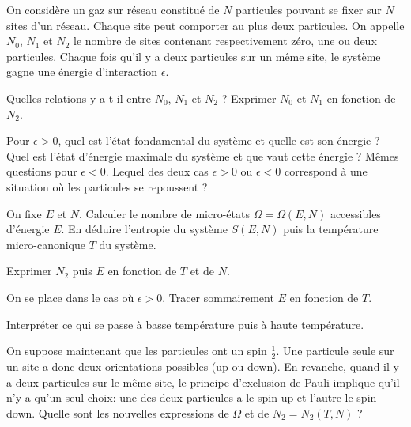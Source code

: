 On considère un gaz sur réseau constitué de $N$ particules pouvant se fixer sur $N$ sites d'un réseau. Chaque site peut comporter au plus deux particules. On appelle $N_0$, $N_1$ et $N_2$ le nombre de sites contenant respectivement zéro, une ou deux particules. Chaque fois qu'il y a deux particules sur un même site, le système gagne une énergie d’interaction $\epsilon$. 

\question Quelles relations y-a-t-il entre $N_0$, $N_1$ et $N_2$ ? Exprimer $N_0$ et $N_1$ en fonction de $N_2$.

\question Pour $\epsilon > 0 $, quel est l’état fondamental du système et quelle est son énergie ? Quel est l’état d’énergie maximale du système et que vaut cette énergie ? Mêmes questions pour $\epsilon < 0 $. Lequel des deux cas $\epsilon > 0 $ ou $\epsilon < 0 $ correspond à une situation où les particules se repoussent ?

\question On fixe $E$ et $N$. Calculer le nombre de micro-états $\Omega=\Omega(E,N)$ accessibles d'énergie $E$. En déduire l'entropie du système $S(E,N)$ puis la température micro-canonique $T$ du système.

\question Exprimer $N_2$ puis $E$ en fonction de $T$ et de $N$.  

\question On se place dans le cas où $\epsilon > 0 $. Tracer sommairement $E$ en fonction de $T$.

\question Interpréter ce qui se passe à basse température puis à haute température.

\question On suppose maintenant que les particules ont un spin $\frac{1}{2}$. Une particule seule sur un site a donc deux orientations possibles (up ou down). En revanche, quand il y a deux particules sur le même site, le principe d’exclusion de Pauli implique qu'il n’y a qu'un seul choix: une des deux particules a le spin up et l'autre le spin down. Quelle sont les nouvelles expressions de $\Omega$ et de $N_2=N_2(T,N)$ ?
